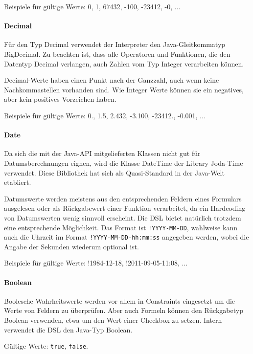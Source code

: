 Beispiele für gültige Werte: 0, 1, 67432, -100, -23412, -0, ...


\paragraph{Decimal}

Für den Typ Decimal verwendet der Interpreter den Java-Gleit\-kom\-ma\-typ BigDecimal. Zu beachten ist, dass alle Operatoren und Funktionen, die den Datentyp Decimal verlangen, auch Zahlen vom Typ Integer verarbeiten können.

Decimal-Werte haben einen Punkt nach der Ganzzahl, auch wenn keine Nachkommastellen vorhanden sind. Wie Integer Werte können sie ein negatives, aber kein positives Vorzeichen haben.

Beispiele für gültige Werte: 0., 1.5, 2.432, -3.100, -23412., -0.001, ...


\paragraph*{Date}

Da sich die mit der Java-API mitgelieferten Klassen nicht gut für Datumsberechnungen eignen, wird die Klasse DateTime der Library Joda-Time\cite{wwwJodaTime} verwendet. Diese Bibliothek hat sich als Quasi-Standard in der Java-Welt etabliert.

Datumswerte werden meistens aus den ent\-sprech\-enden Feldern eines Formulars ausgelesen oder als Rückgabewert einer Funktion verarbeitet, da ein Hardcoding von Datumswerten wenig sinnvoll erscheint. Die DSL bietet natürlich trotzdem eine ent\-sprech\-ende Möglichkeit. Das Format ist \texttt{!YYYY-MM-DD}, wahlweise kann auch die Uhrzeit im Format \texttt{!YYYY-MM-DD-hh:mm:ss} angegeben werden, wobei die Angabe der Sekunden wiederum optional ist.

Beispiele für gültige Werte: !1984-12-18, !2011-09-05-11:08, ...


\paragraph*{Boolean}

Boolesche Wahrheitswerte werden vor allem in Constraints eingesetzt um die Werte von Feldern zu überprüfen. Aber auch Formeln können den Rückgabetyp Boolean verwenden, etwa um den Wert einer Checkbox zu setzen. Intern verwendet die DSL den Java-Typ Boolean.

Gültige Werte: \texttt{true}, \texttt{false}.



